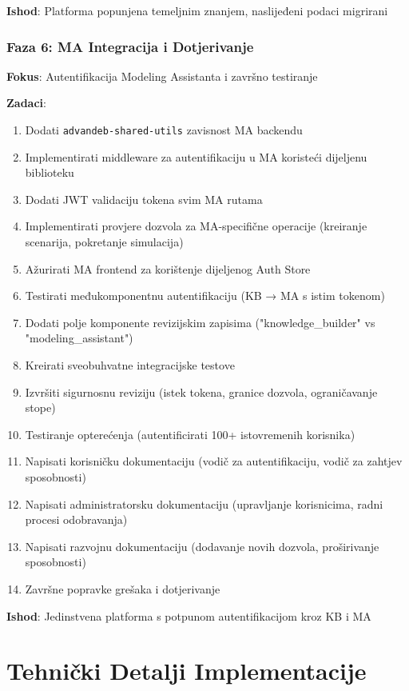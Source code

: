 \documentclass[12pt,a4paper]{article}
\begin{document}
\textbf{Ishod}: Platforma popunjena temeljnim znanjem, naslijeđeni podaci migrirani

\subsubsection{Faza 6: MA Integracija i Dotjerivanje}
\textbf{Fokus}: Autentifikacija Modeling Assistanta i završno testiranje

\textbf{Zadaci}:
\begin{enumerate}
    \item Dodati \texttt{advandeb-shared-utils} zavisnost MA backendu
    \item Implementirati middleware za autentifikaciju u MA koristeći dijeljenu biblioteku
    \item Dodati JWT validaciju tokena svim MA rutama
    \item Implementirati provjere dozvola za MA-specifične operacije (kreiranje scenarija, pokretanje simulacija)
    \item Ažurirati MA frontend za korištenje dijeljenog Auth Store
    \item Testirati međukomponentnu autentifikaciju (KB → MA s istim tokenom)
    \item Dodati polje komponente revizijskim zapisima ("knowledge\_builder" vs "modeling\_assistant")
    \item Kreirati sveobuhvatne integracijske testove
    \item Izvršiti sigurnosnu reviziju (istek tokena, granice dozvola, ograničavanje stope)
    \item Testiranje opterećenja (autentificirati 100+ istovremenih korisnika)
    \item Napisati korisničku dokumentaciju (vodič za autentifikaciju, vodič za zahtjev sposobnosti)
    \item Napisati administratorsku dokumentaciju (upravljanje korisnicima, radni procesi odobravanja)
    \item Napisati razvojnu dokumentaciju (dodavanje novih dozvola, proširivanje sposobnosti)
    \item Završne popravke grešaka i dotjerivanje
\end{enumerate}

\textbf{Ishod}: Jedinstvena platforma s potpunom autentifikacijom kroz KB i MA

\section{Tehnički Detalji Implementacije}
\end{document}
